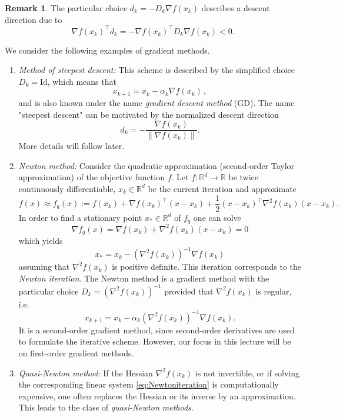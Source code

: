 \documentclass[12pt,openany]{book}
\theoremstyle{definition}
\newtheorem{remark}[thm]{Remark}
\theoremstyle{definition}
\newcommand{\R}{\mathbb{R}}
\begin{document}
\begin{remark}
The particular choice $d_k=-D_k\nabla f(x_k)$ describes a descent direction due to
\[\nabla f(x_k)^\top d_k = -\nabla f(x_k)^\top D_k \nabla f(x_k) < 0. \]
\end{remark}

We consider the following examples of gradient methods.
\begin{enumerate}
\item[a)] \textit{Method of steepest descent:} This scheme is described by the simplified choice $D_k= {\mathrm{Id}}$, which means that
\begin{equation}\label{eq:GD_method}
x_{k+1} = x_k - \alpha_k \nabla f(x_k)\,,
\end{equation}
and is also known under the name \textit{gradient descent method} (GD). The name "steepest descent" can be motivated by the normalized descent direction 
\[d_k = -\frac{\nabla f(x_k)}{\|\nabla f(x_k)\|}.\]
More details will follow later.
\item[b)] \textit{Newton method:} Consider the quadratic approximation (second-order Taylor approximation) of the objective function $f$. Let $f:\R^d\to\R$ be twice continuously differentiable, $x_k\in\R^d$ be the current iteration and approximate
\[f(x) \approx f_q(x) := f(x_k) + \nabla f(x_k)^\top (x-x_k) + \frac12 (x-x_k)^\top \nabla^2f(x_k)(x-x_k). \]
In order to find a stationary point $x_\ast\in\R^d$ of $f_q$ one can solve
\[\nabla f_q(x) = \nabla f(x_k) + \nabla^2 f(x_k) (x-x_k) = 0 \]
which yields
\begin{equation}\label{eq:Newtoniteration}
x_\ast = x_k-(\nabla^2f(x_k))^{-1}\nabla f(x_k)
\end{equation}
assuming that $\nabla^2 f(x_k)$ is positive definite. This iteration corresponds to the \textit{Newton iteration}. The Newton method is a gradient method with the particular choice $D_k = (\nabla^2 f(x_k))^{-1}$ provided that $\nabla^2 f(x_k)$ is regular, i.e.~
\[x_{k+1} = x_k - \alpha_k (\nabla^2f(x_k))^{-1}\nabla f(x_k).\]
It is a second-order gradient method, since  second-order derivatives are used to formulate the iterative scheme. However,  our focus in this lecture will be on first-order gradient methods.
\item[c)] \textit{Quasi-Newton method:} If the Hessian $\nabla^2 f(x_k)$ is not invertible, or if solving the corresponding linear system \eqref{eq:Newtoniteration} is computationally expensive, one often replaces the Hessian or its inverse by an approximation. This leads to the class of \textit{quasi-Newton methods}.
\end{enumerate}
\end{document}

